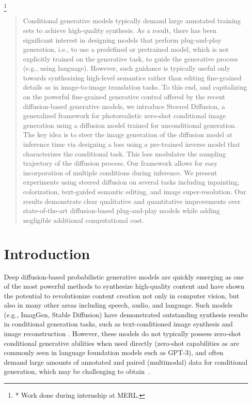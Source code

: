 \documentclass[10pt,twocolumn,letterpaper]{article}
\newcommand\blfootnote[1]{%
  \begingroup
  \renewcommand\thefootnote{}\footnote{#1}%
  \addtocounter{footnote}{-1}%
  \endgroup
}
\begin{document}
\blfootnote{* Work done during internship at MERL.}
\begin{abstract}
  Conditional generative models typically demand large annotated training sets to achieve high-quality synthesis. As a result, there has been significant interest in designing models that perform plug-and-play generation, i.e., to use a predefined or pretrained model, which is not explicitly trained on the generative task, to guide the generative process (e.g., using language). However, such guidance is typically useful only towards synthesizing high-level semantics rather than editing fine-grained details as in image-to-image translation tasks. To this end, and capitalizing on the powerful fine-grained generative control offered by the recent diffusion-based generative models, we introduce Steered Diffusion, a generalized framework for photorealistic zero-shot conditional image generation using a diffusion model trained for unconditional generation. The key idea is to steer the image generation of the diffusion model at inference time via designing a loss using a pre-trained inverse model that characterizes the conditional task. This loss modulates the sampling trajectory of the diffusion process. Our framework allows for easy incorporation of multiple conditions during inference. We present experiments using steered diffusion on several tasks including inpainting, colorization, text-guided semantic editing, and image super-resolution. Our results demonstrate clear qualitative and quantitative improvements over state-of-the-art diffusion-based plug-and-play models while adding negligible additional computational cost.  
 
  

\end{abstract}
\vspace{-24pt}
\section{Introduction}
Deep diffusion-based probabilistic generative models\cite{ho2020denoising, sohl2015deep, dhariwal2021diffusion} are quickly emerging as one of the most powerful methods to synthesize high-quality content and have shown the potential to revolutionize content creation not only in computer vision, but also in many other areas including speech, audio, and language. Such models (e.g., ImagGen\cite{saharia2022photorealistic}, Stable Diffusion\cite{rombach2021highresolution}) have demonstrated outstanding synthesis results in conditional generation tasks, such as text-conditioned image synthesis \cite{balaji2022ediffi, ramesh2022hierarchical} and image reconstruction \cite{saharia2022palette, saharia2022image, preechakul2022diffusion}. However, these models do not typically possess zero-shot conditional generative abilities when used directly (zero-shot capabilities as are commonly seen in language foundation models such as GPT-3\cite{brown2020language}), and often demand large amounts of annotated and paired (multimodal) data for conditional generation, which may be challenging to obtain~\cite{huang2021multimodal}.
\end{document}
